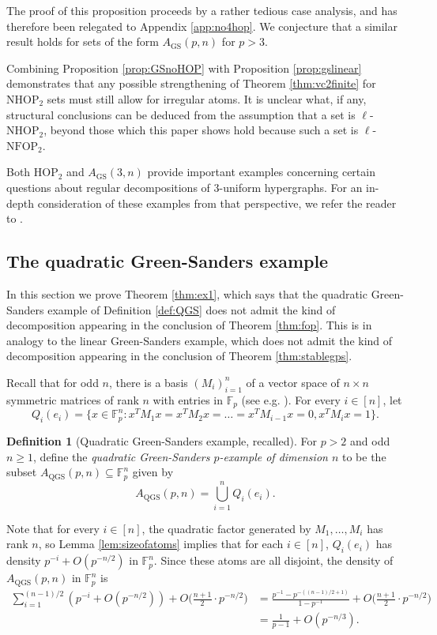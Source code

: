 \documentclass[12pt,oneside,british,a4wide]{amsart}
\numberwithin{equation}{section}
\theoremstyle{definition}
\newtheorem{definition}[theorem]{Definition}
\def\F{\mathbb{F}}
\def\NFOP{\mathrm{NFOP}}
\def\HOP{\mathrm{HOP}}
\def\NHOP{\mathrm{NHOP}}
\def\GS{\mathrm{GS}}
\def\QGS{\mathrm{QGS}}
\begin{document}
The proof of this proposition proceeds by a rather tedious case analysis, and has therefore been relegated to Appendix \ref{app:no4hop}.  We conjecture that a similar result holds for sets of the form $A_{\GS}(p,n)$ for $p>3$.  

Combining Proposition \ref{prop:GSnoHOP} with Proposition \ref{prop:gslinear} demonstrates that any possible strengthening of Theorem \ref{thm:vc2finite} for $\NHOP_2$ sets must still allow for irregular atoms. It is unclear what, if any, structural conclusions can be deduced from the assumption that a set is $\ell$-$\NHOP_2$, beyond those which this paper shows hold because such a set is $\ell$-$\NFOP_2$.  

Both $\HOP_2$ and $A_{\GS}(3,n)$ provide important examples concerning certain questions about regular decompositions of 3-uniform hypergraphs. For an in-depth consideration of these examples from that perspective, we refer the reader to \cite[Section 7]{Terry.2021b}.

\subsection{The quadratic Green-Sanders example}\label{subsec:qgs}

In this section we prove Theorem \ref{thm:ex1}, which says that the quadratic Green-Sanders example of Definition \ref{def:QGS} does not admit the kind of decomposition appearing in the conclusion of Theorem \ref{thm:fop}.   This is in analogy to the linear Green-Sanders example, which does not admit the kind of decomposition appearing in the conclusion of Theorem \ref{thm:stablegps}.

Recall that for odd $n$, there is a basis $(M_i)_{i=1}^n$ of a vector space of $n\times n$ symmetric matrices of rank $n$ with entries in $\F_p$ (see e.g. \cite[Lemma 3]{Dumas.2011}). For every $i\in [n]$, let
\[Q_i(e_i)=\{x\in \F_p^n:x^TM_1x=x^TM_2x=\dots = x^TM_{i-1}x=0, x^TM_ix=1\}.\]

\begin{definition}[Quadratic Green-Sanders example, recalled]\label{def:QGSrecall}
For $p>2$ and odd $n\geq 1$, define the \emph{quadratic Green-Sanders $p$-example of dimension $n$} to be the subset $A_\QGS(p,n)\subseteq \F_p^n$ given by
\[A_{\QGS}(p,n)=\bigcup_{i=1}^n Q_i(e_i).\]
\end{definition}

Note that for every $i\in [n]$, the quadratic factor generated by $M_1,\dots, M_i$ has rank $n$, so Lemma \ref{lem:sizeofatoms} implies that for each $i\in [n]$, $Q_i(e_i)$ has density $p^{-i}+O(p^{-n/2})$ in $\F_p^n$. Since these atoms are all disjoint, the density of $A_{\QGS}(p,n)$ in $\F_p^n$ is 
\begin{align*}
\sum_{i=1}^{(n-1)/2}\left(p^{-i}+O(p^{-n/2})\right)+O\big(\frac{n+1}{2}\cdot p^{-n/2}\big)&=\frac{p^{-1}-p^{-((n-1)/2+1)}}{1-p^{-1}}+O\big(\frac{n+1}{2}\cdot p^{-n/2}\big)\\
&=\frac{1}{p-1}+O(p^{-n/3}).
\end{align*}
\end{document}
